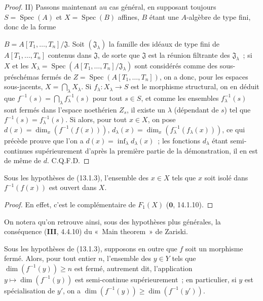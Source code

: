 \begin{proof}
II) Passons maintenant au cas général, en supposant toujours
$S=\operatorname{Spec}(A)$ et $X=\operatorname{Spec}(B)$ affines, $B$ étant
une $A$-algèbre de type fini, donc de la forme

$B=A[T_1,\ldots,T_n]/\mathfrak J$. Soit $(\mathfrak J_\lambda)$ la famille des
idéaux de type fini de $A[T_1,\ldots,T_n]$ contenus dans $\mathfrak J$, de
sorte que $\mathfrak J$ est la réunion filtrante des $\mathfrak J_\lambda$~;
si $X$ et les
$X_\lambda=\operatorname{Spec}(A[T_1,\ldots,T_n]/\mathfrak J_\lambda)$ sont
considérés comme des sous-préschémas fermés de
$Z=\operatorname{Spec}(A[T_1,\ldots,T_n])$, on a donc, pour les espaces
sous-jacents, $X=\bigcap_\lambda X_\lambda$. Si $f_\lambda:X_\lambda\to S$ est
le morphisme structural, on en déduit que
$f^{-1}(s)=\bigcap_\lambda f_\lambda^{-1}(s)$ pour tout $s\in S$, et comme les
ensembles $f_\lambda^{-1}(s)$ sont fermés dans l'espace noethérien $Z_s$, il
existe un $\lambda$ (dépendant de $s$) tel que
$f^{-1}(s)=f_\lambda^{-1}(s)$. Si alors, pour tout $x\in X$, on pose
$d(x)=\dim_x(f^{-1}(f(x)))$, $d_\lambda(x)=\dim_x(f_\lambda^{-1}(f_\lambda(x)))$,
ce qui précède prouve que l'on a $d(x)=\inf_\lambda d_\lambda(x)$~; les
fonctions $d_\lambda$ étant semi-continues supérieurement d'après la première
partie de la démonstration, il en est de même de $d$. C.Q.F.D.
\end{proof}

\begin{corollary}[13.1.4]
\label{IV.13.1.4-fr}
Sous les hypothèses de (13.1.3), l'ensemble des $x\in X$ tels que $x$ soit
isolé dans $f^{-1}(f(x))$ est ouvert dans $X$.
\end{corollary}

\begin{proof}
En effet, c'est le complémentaire de $F_1(X)$ ($\mathbf 0$, 14.1.10).
\end{proof}

On notera qu'on retrouve ainsi, sous des hypothèses plus générales, la
conséquence (\textbf{III}, 4.4.10) du «~Main theorem~» de Zariski.

\begin{corollary}[13.1.5]
\label{IV.13.1.5-fr}
Sous les hypothèses de (13.1.3), supposons en outre que $f$ soit un morphisme
fermé. Alors, pour tout entier $n$, l'ensemble des $y\in Y$ tels que
$\dim(f^{-1}(y))\geq n$ est fermé, autrement dit, l'application
$y\mapsto\dim(f^{-1}(y))$ est semi-continue supérieurement~; en particulier,
si $y$ est spécialisation de $y'$, on a
$\dim(f^{-1}(y))\geq\dim(f^{-1}(y'))$.
\end{corollary}

